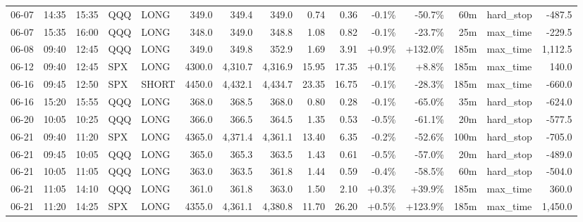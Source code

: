 \documentclass[11pt,a4paper,twoside]{article}
\begin{document}
\begin{landscape}
\begin{center}
\begin{longtable}{>{\color{txtmain}}l l l l l r r r r r r r r >{\color{txtmain}}l r}
06-07 & 14:35 & 15:35 & QQQ & LONG & 349.0 & 349.4 & 349.0 & 0.74 & 0.36 & \textcolor{lossred}{-0.1\%} & \textcolor{lossred}{-50.7\%} & 60m & hard\_stop & \textcolor{lossred}{-487.5} \\
06-07 & 15:35 & 16:00 & QQQ & LONG & 348.0 & 349.0 & 348.8 & 1.08 & 0.82 & \textcolor{lossred}{-0.1\%} & \textcolor{lossred}{-23.7\%} & 25m & max\_time & \textcolor{lossred}{-229.5} \\
06-08 & 09:40 & 12:45 & QQQ & LONG & 349.0 & 349.8 & 352.9 & 1.69 & 3.91 & \textcolor{wingreen}{+0.9\%} & \textcolor{wingreen}{+132.0\%} & 185m & max\_time & \textcolor{wingreen}{1,112.5} \\
06-12 & 09:40 & 12:45 & SPX & LONG & 4300.0 & 4,310.7 & 4,316.9 & 15.95 & 17.35 & \textcolor{wingreen}{+0.1\%} & \textcolor{wingreen}{+8.8\%} & 185m & max\_time & \textcolor{wingreen}{140.0} \\
06-16 & 09:45 & 12:50 & SPX & SHORT & 4450.0 & 4,432.1 & 4,434.7 & 23.35 & 16.75 & \textcolor{lossred}{-0.1\%} & \textcolor{lossred}{-28.3\%} & 185m & max\_time & \textcolor{lossred}{-660.0} \\
06-16 & 15:20 & 15:55 & QQQ & LONG & 368.0 & 368.5 & 368.0 & 0.80 & 0.28 & \textcolor{lossred}{-0.1\%} & \textcolor{lossred}{-65.0\%} & 35m & hard\_stop & \textcolor{lossred}{-624.0} \\
06-20 & 10:05 & 10:25 & QQQ & LONG & 366.0 & 366.5 & 364.5 & 1.35 & 0.53 & \textcolor{lossred}{-0.5\%} & \textcolor{lossred}{-61.1\%} & 20m & hard\_stop & \textcolor{lossred}{-577.5} \\
06-21 & 09:40 & 11:20 & SPX & LONG & 4365.0 & 4,371.4 & 4,361.1 & 13.40 & 6.35 & \textcolor{lossred}{-0.2\%} & \textcolor{lossred}{-52.6\%} & 100m & hard\_stop & \textcolor{lossred}{-705.0} \\
06-21 & 09:45 & 10:05 & QQQ & LONG & 365.0 & 365.3 & 363.5 & 1.43 & 0.61 & \textcolor{lossred}{-0.5\%} & \textcolor{lossred}{-57.0\%} & 20m & hard\_stop & \textcolor{lossred}{-489.0} \\
06-21 & 10:05 & 11:05 & QQQ & LONG & 363.0 & 363.5 & 361.8 & 1.44 & 0.59 & \textcolor{lossred}{-0.4\%} & \textcolor{lossred}{-58.5\%} & 60m & hard\_stop & \textcolor{lossred}{-504.0} \\
06-21 & 11:05 & 14:10 & QQQ & LONG & 361.0 & 361.8 & 363.0 & 1.50 & 2.10 & \textcolor{wingreen}{+0.3\%} & \textcolor{wingreen}{+39.9\%} & 185m & max\_time & \textcolor{wingreen}{360.0} \\
06-21 & 11:20 & 14:25 & SPX & LONG & 4355.0 & 4,361.1 & 4,380.8 & 11.70 & 26.20 & \textcolor{wingreen}{+0.5\%} & \textcolor{wingreen}{+123.9\%} & 185m & max\_time & \textcolor{wingreen}{1,450.0} \\

\end{longtable}
\end{center}
\end{landscape}
\end{document}
